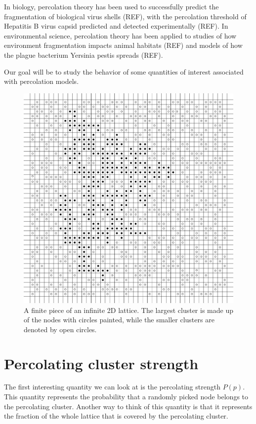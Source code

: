 In biology, percolation theory has been used to successfully predict the fragmentation of biological virus shells (REF), with the percolation threshold of Hepatitis B virus capsid predicted and detected experimentally (REF). In environmental science, percolation theory has been applied to studies of how environment fragmentation impacts animal habitats (REF) and models of how the plague bacterium Yersinia pestis spreads (REF).


Our goal will be to study the behavior of some quantities of interest associated with percolation models.

\begin{figure}[H]
  \includegraphics[width=\linewidth]{Images/2dlattice.png}
  \caption{A finite piece of an infinite 2D lattice. The largest cluster is made up of the nodes with circles painted, while the smaller clusters are denoted by open circles.}
  \label{fig:2dlattice}
\end{figure}

\section{Percolating cluster strength}
\label{sec:th_percolating_cluster_strength}

The first interesting quantity we can look at is the percolating strength $P(p)$. This quantity  represents the probability that a randomly picked node belongs to the percolating cluster. Another way to think of this quantity is that it represents the fraction of the whole lattice that is covered by the percolating cluster. 

